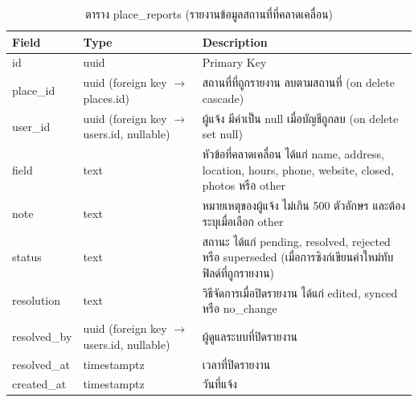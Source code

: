 \begin{table}[H]
\centering
\caption{ตาราง place\_reports (รายงานข้อมูลสถานที่ที่คลาดเคลื่อน)}
\label{tab:db_reports}
\begin{tabular}{|p{3.6cm}|p{2.6cm}|p{6.8cm}|}
\hline
\textbf{Field} & \textbf{Type} & \textbf{Description} \\
\hline
id & uuid & Primary Key \\ \hline
place\_id & uuid (foreign key $\to$ places.id) & สถานที่ที่ถูกรายงาน ลบตามสถานที่ (on delete cascade) \\ \hline
user\_id & uuid (foreign key $\to$ users.id, nullable) & ผู้แจ้ง มีค่าเป็น null เมื่อบัญชีถูกลบ (on delete set null) \\ \hline
field & text & หัวข้อที่คลาดเคลื่อน ได้แก่ name, address, location, hours, phone, website, closed, photos หรือ other \\ \hline
note & text & หมายเหตุของผู้แจ้ง ไม่เกิน 500 ตัวอักษร และต้องระบุเมื่อเลือก other \\ \hline
status & text & สถานะ ได้แก่ pending, resolved, rejected หรือ superseded (เมื่อการซิงก์เขียนค่าใหม่ทับฟิลด์ที่ถูกรายงาน) \\ \hline
resolution & text & วิธีจัดการเมื่อปิดรายงาน ได้แก่ edited, synced หรือ no\_change \\ \hline
resolved\_by & uuid (foreign key $\to$ users.id, nullable) & ผู้ดูแลระบบที่ปิดรายงาน \\ \hline
resolved\_at & timestamptz & เวลาที่ปิดรายงาน \\ \hline
created\_at & timestamptz & วันที่แจ้ง \\
\hline
\end{tabular}
\end{table}

